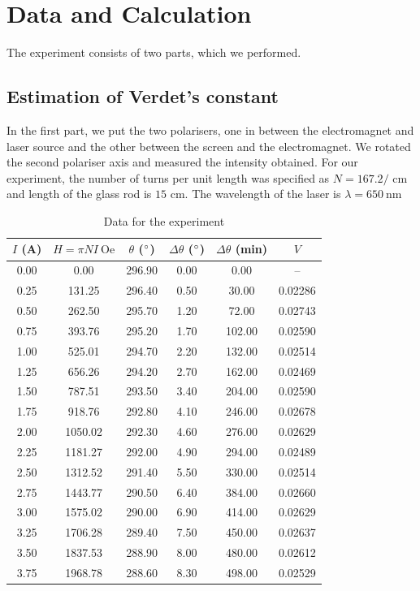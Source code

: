 \section{Data and Calculation}
The experiment consists of two parts, which we performed.
\subsection{Estimation of Verdet's constant}
In the first part, we put the two polarisers, one in between the electromagnet and laser source and the other between the screen and the electromagnet. We rotated the second polariser axis and measured the intensity obtained. For our experiment, the number of turns per unit length was specified as $N=167.2/\text{ cm}$ and length of the glass rod is $15\text{ cm}$. The wavelength of the laser is $\lambda = 650\ \text{nm}$
\begin{table}[H]
\centering
\begin{tabular}{|c|c|c|c|c|c|}
\hline
$I$ (A) & $H=\pi NI\ \mathrm{Oe}$ & $\theta$ ($\degree$) & $\Delta \theta$ ($\degree$) & $\Delta \theta$ (min) & $V$ \\ 
\hline
0.00 & 0.00 & 296.90 & 0.00 & 0.00 & -- \\ 
0.25 & 131.25 & 296.40 & 0.50 & 30.00 & 0.02286 \\ 
0.50 & 262.50 & 295.70 & 1.20 & 72.00 & 0.02743 \\ 
0.75 & 393.76 & 295.20 & 1.70 & 102.00 & 0.02590 \\ 
1.00 & 525.01 & 294.70 & 2.20 & 132.00 & 0.02514 \\ 
1.25 & 656.26 & 294.20 & 2.70 & 162.00 & 0.02469 \\ 
1.50 & 787.51 & 293.50 & 3.40 & 204.00 & 0.02590 \\ 
1.75 & 918.76 & 292.80 & 4.10 & 246.00 & 0.02678 \\ 
2.00 & 1050.02 & 292.30 & 4.60 & 276.00 & 0.02629 \\ 
2.25 & 1181.27 & 292.00 & 4.90 & 294.00 & 0.02489 \\ 
2.50 & 1312.52 & 291.40 & 5.50 & 330.00 & 0.02514 \\ 
2.75 & 1443.77 & 290.50 & 6.40 & 384.00 & 0.02660 \\ 
3.00 & 1575.02 & 290.00 & 6.90 & 414.00 & 0.02629 \\ 
3.25 & 1706.28 & 289.40 & 7.50 & 450.00 & 0.02637 \\ 
3.50 & 1837.53 & 288.90 & 8.00 & 480.00 & 0.02612 \\ 
3.75 & 1968.78 & 288.60 & 8.30 & 498.00 & 0.02529 \\ 
\hline
\end{tabular}
\caption{Data for the experiment}
\end{table}
